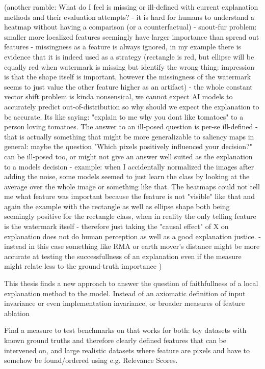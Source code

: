 {(another ramble:
What do I feel is missing or ill-defined with current explanation methods and their evaluation attempts?
- it is hard for humans to understand a heatmap without having a comparison (or a counterfactual)
- snout-fur problem: smaller more localized features seemingly have larger importance than spread out features
- missingness as a feature is always ignored, in my example there is evidence that it is indeed used as a strategy (rectangle is red, but ellipse will be equally red when watermark is missing but identify the wrong thing: impression is that the shape itself is important, however the missingness of the watermark seems to just value the other feature higher as an artifact)
- the whole constant vector shift problem is kinda nonsensical, we cannot expect AI models to accurately predict out-of-distribution so why should we expect the explanation to be accurate. Its like saying: "explain to me why you dont like tomatoes" to a person loving tomatoes. The answer to an ill-posed question is per-se ill-defined
- that is actually something that might be more generalizable to saliency maps in general: maybe the question "Which pixels positively influenced your decision?" can be ill-posed too, or might not give an answer well suited as the explanation to a models decision
- example: when I accidentally normalized the images after adding the noise, some models seemed to just learn the class by looking at the average over the whole image or something like that. The heatmaps could not tell me what feature was important because the feature is not "visible" like that
and again the example with the rectangle as well as ellipse shape both being seemingly positive for the rectangle class, when in reality the only telling feature is the watermark itself
- therefore just taking the "causal effect" of X on explanation does not do human perception as well as a good explanation justice.
- instead in this case something like RMA or earth mover's distance might be more accurate at testing the successfullness of an explanation even if the measure might relate less to the ground-truth importance
)


This thesis finds a new approach to answer the question of faithfullness of a local explanation method to the model. 
Instead of an axiomatic definition of input invariance or even implementation invariance, or broader measures of feature ablation

Find a measure to test benchmarks on that works for both: toy datasets with known ground truths and therefore clearly defined features that can be intervened on, and large realistic datasets where feature are pixels and have to somehow be found/ordered using e.g. Relevance Scores.

}
